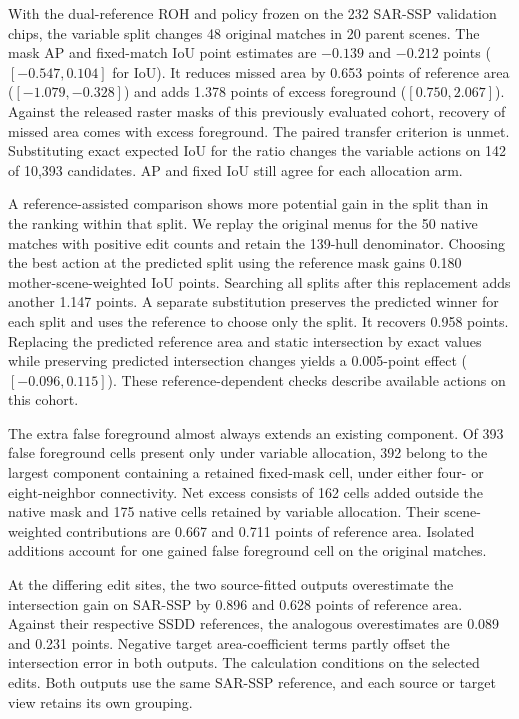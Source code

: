\documentclass[journal]{IEEEtran}
\begin{document}
With the dual-reference ROH and policy frozen on the 232 SAR-SSP validation chips, the variable split changes 48 original matches in 20 parent scenes. The mask AP and fixed-match IoU point estimates are \(-0.139\) and \(-0.212\) points (\([-0.547,0.104]\) for IoU). It reduces missed area by 0.653 points of reference area (\([-1.079,-0.328]\)) and adds 1.378 points of excess foreground (\([0.750,2.067]\)). Against the released raster masks of this previously evaluated cohort, recovery of missed area comes with excess foreground. The paired transfer criterion is unmet. Substituting exact expected IoU for the ratio changes the variable actions on 142 of 10,393 candidates. AP and fixed IoU still agree for each allocation arm.

A reference-assisted comparison shows more potential gain in the split than in the ranking within that split. We replay the original menus for the 50 native matches with positive edit counts and retain the 139-hull denominator. Choosing the best action at the predicted split using the reference mask gains 0.180 mother-scene-weighted IoU points. Searching all splits after this replacement adds another 1.147 points. A separate substitution preserves the predicted winner for each split and uses the reference to choose only the split. It recovers 0.958 points. Replacing the predicted reference area and static intersection by exact values while preserving predicted intersection changes yields a 0.005-point effect (\([-0.096,0.115]\)). These reference-dependent checks describe available actions on this cohort.

The extra false foreground almost always extends an existing component. Of 393 false foreground cells present only under variable allocation, 392 belong to the largest component containing a retained fixed-mask cell, under either four- or eight-neighbor connectivity. Net excess consists of 162 cells added outside the native mask and 175 native cells retained by variable allocation. Their scene-weighted contributions are 0.667 and 0.711 points of reference area. Isolated additions account for one gained false foreground cell on the original matches.

At the differing edit sites, the two source-fitted outputs overestimate the intersection gain on SAR-SSP by 0.896 and 0.628 points of reference area. Against their respective SSDD references, the analogous overestimates are 0.089 and 0.231 points. Negative target area-coefficient terms partly offset the intersection error in both outputs. The calculation conditions on the selected edits. Both outputs use the same SAR-SSP reference, and each source or target view retains its own grouping.
\end{document}

